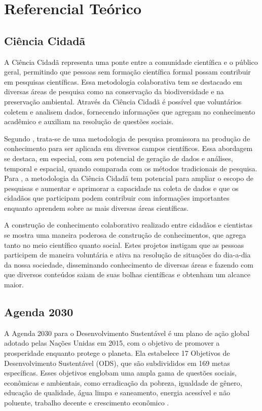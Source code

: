 \chapter{Referencial Teórico}\label{referencial-teorico}

\section{Ciência Cidadã}

A Ciência Cidadã representa uma ponte entre a comunidade científica e o público geral, permitindo que pessoas sem formação científica formal possam contribuir em pesquisas científicas. Essa metodologia colaborativa tem se destacado em diversas áreas de pesquisa como na conservação da biodiversidade e na preservação ambiental. Através da Ciência Cidadã é possível que voluntários coletem e analisem dados, fornecendo informações que agregam no conhecimento acadêmico e auxiliam na resolução de questões sociais.

Segundo , trata-se de uma metodologia de pesquisa promissora na produção de conhecimento para ser aplicada em diversos campos científicos. Essa abordagem se destaca, em especial, com seu potencial de geração de dados e análises, temporal e espacial, quando comparada com os métodos tradicionais de pesquisa. Para , a metodologia da Ciência Cidadã tem potencial para ampliar o escopo de pesquisas e aumentar e aprimorar a capacidade na coleta de dados e que os cidadãos que participam podem contribuir com informações importantes enquanto aprendem sobre as mais diversas áreas científicas.

A construção de conhecimento colaborativo realizado entre cidadãos e cientistas se mostra uma maneira poderosa de construção de conhecimentos, que agrega tanto no meio científico quanto social. Estes projetos instigam que as pessoas participem de maneira voluntária e ativa na resolução de situações do dia-a-dia da nossa sociedade, disseminando conhecimento de diversas áreas e fazendo com que diversos conteúdos saiam de suas bolhas científicas e obtenham um alcance maior.

\section{Agenda 2030}

A Agenda 2030 para o Desenvolvimento Sustentável é um plano de ação global adotado pelas Nações Unidas em 2015, com o objetivo de promover a prosperidade enquanto protege o planeta. Ela estabelece 17 Objetivos de Desenvolvimento Sustentável (ODS), que são subdivididos em 169 metas específicas. Esses objetivos englobam uma ampla gama de questões sociais, econômicas e ambientais, como erradicação da pobreza, igualdade de gênero, educação de qualidade, água limpa e saneamento, energia acessível e não poluente, trabalho decente e crescimento econômico \cite{onu2015ods}.

